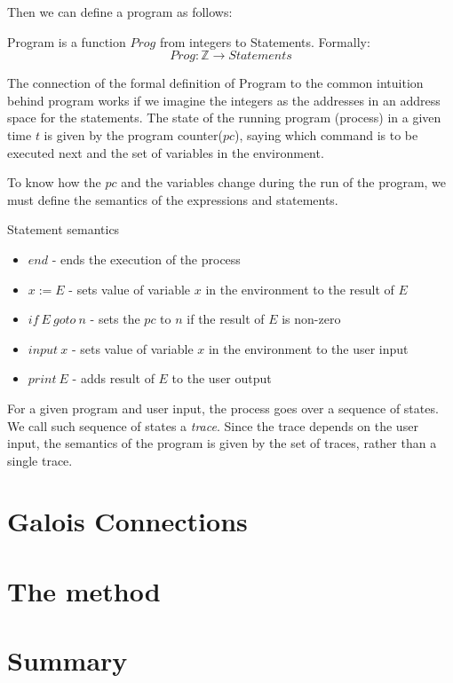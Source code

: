 Then we can define a program as follows:

\begin{defn}[Program]
    Program is a function $Prog$ from integers to Statements.
    Formally:
    \[Prog: \mathbb{Z} \rightarrow Statements\]
\end{defn}

The connection of the formal definition of Program to the common intuition behind program works if we imagine the
integers as the addresses in an address space for the statements. %
The state of the running program (process) in a given time $t$ is given by the program counter($pc$), saying which
command is to be executed next and the set of variables in the environment.

To know how the $pc$ and the variables change during the run of the program, we must define the semantics of the
expressions and statements.

\begin{defn}
\end{defn}

\begin{defn} Statement semantics
    \begin{itemize}
        \item $end$ - ends the execution of the process
        \item $x := E$ - sets value of variable $x$ in the environment to the result of $E$
        \item $if \: E \: goto \: n$ - sets the $pc$ to $n$ if the result of $E$ is non-zero
        \item $input \: x$ - sets value of variable $x$ in the environment to the user input
        \item $print \: E$ - adds result of $E$ to the user output
    \end{itemize}
\end{defn}

For a given program and user input, the process goes over a sequence of states.
We call such sequence of states a \textit{trace}.
Since the trace depends on the user input, the semantics of the program is given by the set of traces, rather than
a single trace.



\section{Galois Connections} %



\section{The method} %


\section*{Summary}
